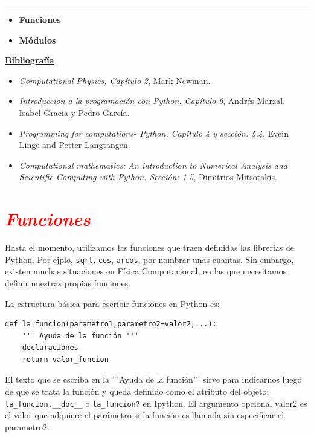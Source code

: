 \documentclass[12pt]{article}
\begin{document}
		\thispagestyle{firstpage}
		\vspace*{1.5cm}
	
	\begin{center}
		\rule{\textwidth}{0.4pt}
	\end{center}
	
	\begin{itemize}[leftmargin=*,label=\textcolor{red}{\ensuremath{\blacktriangleright}}]
		\item \textbf{Funciones}
		\item \textbf{Módulos}
	\end{itemize}
	
	\noindent
	\textbf{\underline{Bibliografía}}
	\begin{itemize}[leftmargin=*, label={\textcolor{blue}{$\bullet$}}]
		\item \textit{Computational Physics, Capítulo 2}, Mark Newman.
		\item \textit{Introducción a la programación con Python. Capítulo 6}, Andrés Marzal, Isabel Gracia y Pedro García.
        \item \textit{Programming for computations- Python,  Capítulo 4 y sección: 5.4}, Evein Linge and Petter Langtangen. 
        \item \textit{Computational mathematics: An introduction to Numerical Analysis and Scientific Computing  with Python.
            Sección: 1.5}, Dimitrios Mitsotakis. 
    \end{itemize}
     
    

\section*{\textcolor{red}{\textit{Funciones}}}
	Hasta el momento, utilizamos las funciones  que traen definidas las 
    librerías de Python. Por ejplo,  \lstinline|sqrt|, \lstinline|cos|, 
    \lstinline|arcos|, por nombrar unas cuantas. Sin embargo, existen muchas 
    situaciones en Física Computacional, en las que necesitamos definir nuestras
    propias funciones.
    
    La estructura básica para escribir funciones en Python es:
	\begin{lstlisting}
def la_funcion(parametro1,parametro2=valor2,...):
	''' Ayuda de la función '''
	declaraciones
	return valor_funcion
	\end{lstlisting}
	El texto que se escriba en la '''Ayuda de la función''' sirve para indicarnos luego 
	de que se trata la función y queda definido como el atributo del objeto: 
	\lstinline|la_funcion.__doc__| o \lstinline|la_funcion?| en Ipython.
	El argumento opcional valor2 es el valor que adquiere el parámetro si la 
	función es llamada sin especificar el parametro2. 
\end{document}
